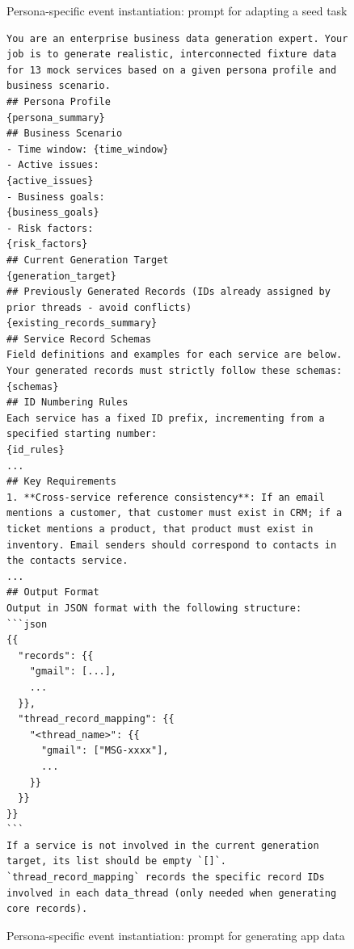 \documentclass{article}
\begin{document}
\begin{figure}[htbp]
\begin{tcolorbox}
\end{tcolorbox}
\caption{Persona-specific event instantiation: prompt for adapting a seed task}
\label{fig:SeedTaskAdaptPrompt}
\end{figure}

\begin{figure}[htbp]
\centering
\begin{tcolorbox}[
    colback=white,           
    colframe=black!60,         
    coltitle=white,            
    colbacktitle=black!60,
    title=Prompt for Generating App Data,    
    fonttitle=\bfseries,       
    boxrule=0.7pt,             
    arc=1mm,                   
    width=1\linewidth,      
]
\begin{lstlisting}[basicstyle=\footnotesize\ttfamily, breaklines=true]
You are an enterprise business data generation expert. Your job is to generate realistic, interconnected fixture data for 13 mock services based on a given persona profile and business scenario.
## Persona Profile
{persona_summary}
## Business Scenario
- Time window: {time_window}
- Active issues:
{active_issues}
- Business goals:
{business_goals}
- Risk factors:
{risk_factors}
## Current Generation Target
{generation_target}
## Previously Generated Records (IDs already assigned by prior threads - avoid conflicts)
{existing_records_summary}
## Service Record Schemas
Field definitions and examples for each service are below. Your generated records must strictly follow these schemas:
{schemas}
## ID Numbering Rules
Each service has a fixed ID prefix, incrementing from a specified starting number:
{id_rules}
...
## Key Requirements
1. **Cross-service reference consistency**: If an email mentions a customer, that customer must exist in CRM; if a ticket mentions a product, that product must exist in inventory. Email senders should correspond to contacts in the contacts service.
...
## Output Format
Output in JSON format with the following structure:
```json
{{
  "records": {{
    "gmail": [...],
    ...
  }},
  "thread_record_mapping": {{
    "<thread_name>": {{
      "gmail": ["MSG-xxxx"],
      ...
    }}
  }}
}}
```
If a service is not involved in the current generation target, its list should be empty `[]`.
`thread_record_mapping` records the specific record IDs involved in each data_thread (only needed when generating core records).

\end{lstlisting}

\end{tcolorbox}
\caption{Persona-specific event instantiation: prompt for generating app data}
\label{fig:DatabaseGeneration}
\end{figure}
\end{document}
